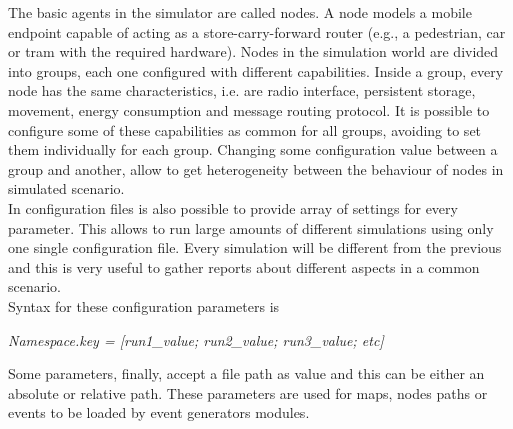 The basic agents in the simulator are called nodes. A node models a mobile endpoint capable of acting as a store-carry-forward router (e.g., a pedestrian, car or tram with the required hardware). Nodes in the simulation world are divided into groups, each one configured with different capabilities. Inside a group, every node has the same characteristics, i.e. are radio interface, persistent storage, movement, energy consumption and message routing protocol. It is possible to configure some of these capabilities as common for all groups, avoiding to set them individually for each group. Changing some configuration value between a group and another, allow to get heterogeneity between the behaviour of nodes in simulated scenario.
\\

In configuration files is also possible to provide array of settings for every parameter. This allows to run large amounts of different simulations using only one  single configuration file. Every simulation will be different from the previous and this is very useful to gather reports about different aspects in a common scenario.
\\ Syntax for these configuration parameters is

\begin{center}
\textit{Namespace.key = [run1\_value; run2\_value; run3\_value; etc]}
\end{center}

Some parameters, finally, accept a file path as value and this can be either an absolute or relative path. These parameters are used for maps, nodes paths or events to be loaded by event generators modules.


